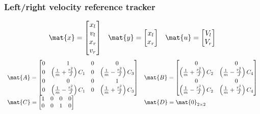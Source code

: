 \subsubsection{Left/right velocity reference tracker}
\begin{equation*}
  \begin{array}{ccc}
    \mat{x} =
    \begin{bmatrix}
      x_l \\
      v_l \\
      x_r \\
      v_r
    \end{bmatrix} &
    \mat{y} =
    \begin{bmatrix}
      x_l \\
      x_r
    \end{bmatrix} &
    \mat{u} =
    \begin{bmatrix}
      V_l \\
      V_r
    \end{bmatrix}
  \end{array}
\end{equation*}
\begin{equation*}
  \begin{array}{ll}
    \mat{A} =
    \begin{bmatrix}
      0 & 1 & 0 & 0 \\
      0 & \left(\frac{1}{m} + \frac{r_b^2}{J}\right) C_1 & 0 & \left(\frac{1}{m} - \frac{r_b^2}{J}\right) C_3 \\
      0 & 0 & 0 & 1 \\
      0 & \left(\frac{1}{m} - \frac{r_b^2}{J}\right) C_1 & 0 & \left(\frac{1}{m} + \frac{r_b^2}{J}\right) C_3
    \end{bmatrix} &
    \mat{B} =
    \begin{bmatrix}
      0 & 0 \\
      \left(\frac{1}{m} + \frac{r_b^2}{J}\right) C_2 & \left(\frac{1}{m} - \frac{r_b^2}{J}\right) C_4 \\
      0 & 0 \\
      \left(\frac{1}{m} - \frac{r_b^2}{J}\right) C_2 & \left(\frac{1}{m} + \frac{r_b^2}{J}\right) C_4
    \end{bmatrix} \\
    \mat{C} =
    \begin{bmatrix}
      1 & 0 & 0 & 0 \\
      0 & 0 & 1 & 0 \\
    \end{bmatrix} &
    \mat{D} = \mat{0}_{2 \times 2}
  \end{array}
\end{equation*}

